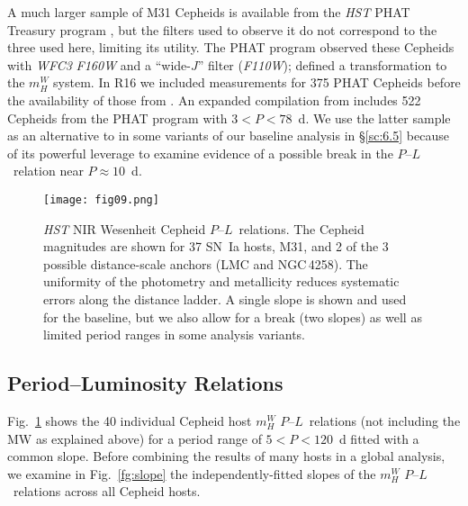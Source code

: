 \documentclass[12pt]{aastex631}
\newcommand{\PLs}{$P$--$L$\ }
\begin{document}
A much larger sample of M31 Cepheids is available from the  {\it HST}  PHAT Treasury program \citep{Dalcanton:2012}, but the filters used to observe it do not correspond to the three used here, limiting its utility.  The PHAT program observed these Cepheids with {\it WFC3} {\it F160W} and a ``wide-$J$'' filter ({\it F110W}); \citet{Riess:2012} defined a transformation to the $m_H^W$ system. In R16 we included measurements for 375 PHAT Cepheids before the availability of those from \citet{Li:2021}. An expanded compilation from \cite{Kodric:2018} includes 522 Cepheids from the PHAT program with $3\!<\!P\!<\!78$~d. We use the latter sample as an alternative to \citet{Li:2021} in some variants of our baseline analysis in \S\ref{sc:6.5} because of its powerful leverage to examine evidence of a possible break in the \PLs relation near $P \approx 10$~d.
     
\begin{figure}[t]
\texttt{[image: fig09.png]}
\caption{\label{fg:plr} {\it HST} NIR Wesenheit Cepheid \PLs relations. The Cepheid magnitudes are shown for 37 SN~Ia hosts, M31, and 2 of the 3 possible distance-scale anchors (LMC and NGC$\,$4258). The uniformity of the photometry and metallicity reduces systematic errors along the distance ladder.  A single slope is shown and used for the baseline, but we also allow for a break (two slopes) as well as limited period ranges in some analysis variants. }
\end{figure}

\subsection{Period--Luminosity Relations\label{sc:4.6}}
   
Fig.~\ref{fg:plr} shows the 40 individual Cepheid host $m^W_H$ \PLs relations (not including the MW as explained above) for a period range of $5\!<\!P\!<\!120$~d fitted with a common slope. Before combining the results of many hosts in a global analysis,  we examine in Fig.~\ref{fg:slope} the independently-fitted slopes of the $m_H^W$ \PLs relations across all Cepheid hosts.
\end{document}
